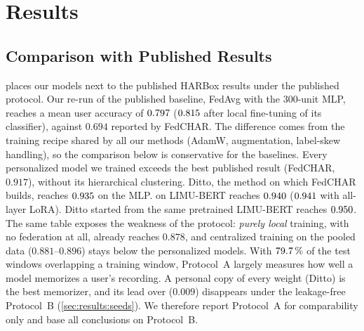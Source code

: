 \section{Results}\label{sec:results}



\subsection{Comparison with Published Results}\label{sec:results:sota}

 places our models next to the published HARBox results under the published
protocol. Our re-run of the published baseline, FedAvg with the 300-unit MLP, reaches a mean user
accuracy of $0.797$ ($0.815$ after local fine-tuning of its classifier),
against $0.694$ reported by FedCHAR. The difference comes from the training recipe shared by all
our methods (AdamW, augmentation, label-skew handling), so the comparison below is conservative for
the baselines. Every personalized model we trained exceeds the best published result (FedCHAR,
$0.917$), without its hierarchical clustering. Ditto, the method on which FedCHAR builds, reaches
$0.935$ on the MLP. \method{} on LIMU-BERT reaches $0.940$ ($0.941$ with all-layer
LoRA). Ditto started from the same pretrained LIMU-BERT reaches $0.950$. The same table exposes
the weakness of the protocol: \emph{purely local} training, with no federation at all, already reaches
$0.878$, and centralized training on the pooled data ($0.881$--$0.896$) stays below the personalized
models. With $79.7\,\%$ of the test windows overlapping a training window, Protocol~A largely
measures how well a model memorizes a user's recording. A personal copy of every weight (Ditto) is the
best memorizer, and its lead over \method{} ($0.009$) disappears under the leakage-free Protocol~B
(\cref{sec:results:seeds}). We therefore report Protocol~A for comparability only and base all
conclusions on Protocol~B.

